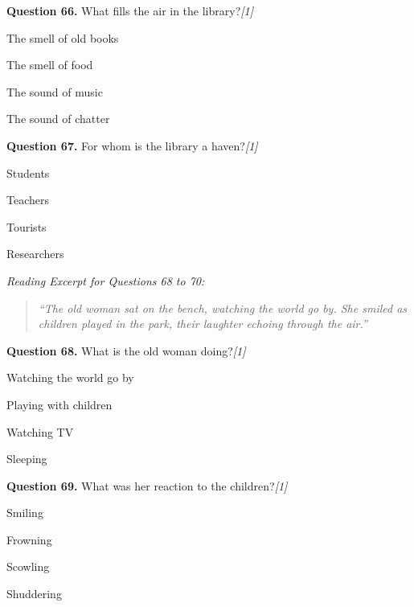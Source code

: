 \documentclass[11pt,a4paper]{article}
\newcommand{\pts}[1]{\hfill   \textit{[#1]}}
\begin{document}
\medskip




\noindent   \textbf{Question 66.} What fills the air in the library?\pts{1}

\begin{parts}
  \item The smell of old books
  \item The smell of food
  \item The sound of music
  \item The sound of chatter
\end{parts}

\medskip




\noindent   \textbf{Question 67.} For whom is the library a haven?\pts{1}

\begin{parts}
  \item Students
  \item Teachers
  \item Tourists
  \item Researchers
\end{parts}

\bigskip



\noindent   \textit{Reading Excerpt for Questions 68 to 70:}

\begin{quote}
   \textit{``The old woman sat on the bench, watching the world go by. She smiled as children played in the park, their laughter echoing through the air.''}
\end{quote}
\smallskip




\noindent   \textbf{Question 68.} What is the old woman doing?\pts{1}

\begin{parts}
  \item Watching the world go by
  \item Playing with children
  \item Watching TV
  \item Sleeping
\end{parts}

\medskip




\noindent   \textbf{Question 69.} What was her reaction to the children?\pts{1}

\begin{parts}
  \item Smiling
  \item Frowning
  \item Scowling
  \item Shuddering
\end{parts}
\end{document}

